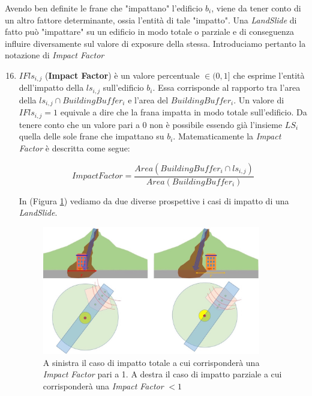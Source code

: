 Avendo ben definite le frane che "impattano" l'edificio $b_i$, viene da tener conto di un altro fattore determinante, ossia l'entità di tale "impatto". Una \textit{LandSlide} di fatto può "impattare" su un edificio in modo totale o parziale e di conseguenza influire diversamente sul valore di exposure della stessa. Introduciamo pertanto la notazione di \textit{Impact Factor}

\begin{enumerate}
	\setcounter{enumi}{15}
	
	\item \textbf{$IFls_{i,j}$} (\textbf{Impact Factor}) è un valore percentuale $\in(0,1]$ che esprime l'entità dell'impatto della $ls_{i,j}$ sull'edificio $b_i$. Essa corrisponde al rapporto tra l'area della $ls_{i,j} \cap BuildingBuffer_i$ e l'area del $BuildingBuffer_i$. Un valore di $IFls_{i,j}=1$ equivale a dire che la frana impatta in modo totale sull'edificio. Da tenere conto che un valore pari a 0 non è possibile essendo già l'insieme $LS_{i}$ quella delle sole frane che impattano su $b_i$. Matematicamente la \textit{Impact Factor} è descritta come segue:
	
	\begin{equation}\label{eq:impactfactor}
	ImpactFactor=\frac{Area(BuildingBuffer_i \cap ls_{i,j})}{Area(BuildingBuffer_i)}
	\end{equation}
	
	In (Figura \ref{impact_factor}) vediamo da due diverse prospettive i casi di impatto di una \textit{LandSlide}.
	
	\begin{figure}[h]
		\centering
		\includegraphics[width=0.9\textwidth]{images/landslide5}
		\caption{A sinistra il caso di impatto totale a cui corrisponderà una \textit{Impact Factor} pari a 1. A destra il caso di impatto parziale a cui corrisponderà una \textit{Impact Factor} $<1$  }
		\label{impact_factor}
	\end{figure}
	
\end{enumerate}

